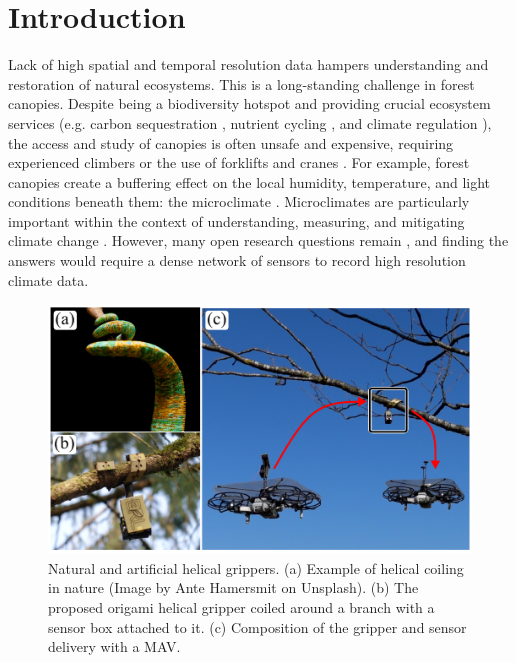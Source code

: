 \section{Introduction}

Lack of high spatial and temporal resolution data hampers understanding and restoration of natural ecosystems. This is a long-standing challenge in forest canopies. Despite being a biodiversity hotspot \cite{Nakamura2017, Ozanne2003d} and providing crucial ecosystem services (e.g. carbon sequestration \cite{Harris2012, Didham2004}, nutrient cycling \cite{CE2002}, and climate regulation \cite{Ellison2012}), the access and study of canopies is often unsafe and expensive, requiring experienced climbers or the use of forklifts and cranes \cite{Parker1992}. For example, forest canopies create a buffering effect on the local humidity, temperature, and light conditions beneath them: the microclimate \cite{Nakamura2017}. Microclimates are particularly important within the context of understanding, measuring, and mitigating climate change \cite{Frenne2021, Zellweger2020, VonArx2012}. However, many open research questions remain \cite{Jucker2020, Bachofen2020, Law2020}, and finding the answers would require a dense network of sensors to record high resolution climate data.
\begin{figure} [htbp]
    \centering
    \includegraphics{chapters/papers/figs/fig_1_all-in-one/Figure_1.pdf}
    \caption{Natural and artificial helical grippers. (a) Example of helical coiling in nature (Image by Ante Hamersmit on Unsplash). (b) The proposed origami helical gripper coiled around a branch with a sensor box attached to it. (c) Composition of the gripper and sensor delivery with a MAV.}
    \label{fig:bio-inspiration}
\end{figure}

